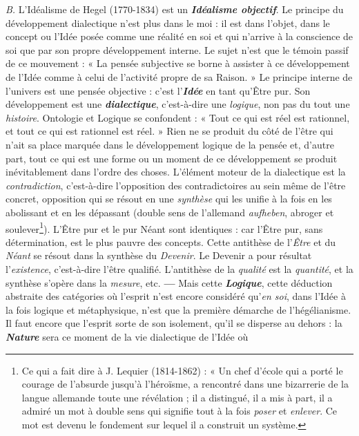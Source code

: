
{\it B.} L'Idéalisme de Hegel (1770-1834) est un \textbf{\textit {Idéalisme objectif}}.
Le principe du développement dialectique n’est plus dans le moi :
il est dans l’objet, dans le concept ou l’Idée posée comme une réalité
en soi et qui n’arrive à la conscience de soi que par son propre développement
interne. Le sujet n’est que le témoin passif de ce mouvement :
« La pensée subjective se borne à assister à ce développement
de l’Idée comme à celui de l’activité propre de sa Raison. » Le principe
interne de l’univers est une pensée objective : c’est l’\textbf{\textit {Idée}} en tant
qu’Être pur. Son développement est une \textbf{\textit {dialectique}}, c’est-à-dire
une {\it logique}, non pas du tout une {\it histoire}. Ontologie et Logique se
confondent : « Tout ce qui est réel est rationnel, et tout ce qui est
rationnel est réel. » Rien ne se produit du côté de l’être qui n’ait sa place
marquée dans le développement logique de la pensée et, d’autre part,
tout ce qui est une forme ou un moment de ce développement se
produit inévitablement dans l’ordre des choses. L'élément moteur
de la dialectique est la {\it contradiction}, c’est-à-dire l'opposition des
contradictoires au sein même de l’être concret, opposition qui se
résout en une {\it synthèse} qui les unifie à la fois en les abolissant et en
les dépassant (double sens de l'allemand {\it aufheben}, abroger et soulever\footnote{Ce qui a fait dire à J. Lequier (1814-1862) : « Un chef d'école qui a porté le courage
de l'absurde jusqu'à l’héroïsme, a rencontré dans une bizarrerie de la langue allemande
toute une révélation ; il a distingué, il a mis à part, il a admiré un mot à double sens
qui signifie tout à la fois {\it poser} et {\it enlever}. Ce mot est devenu le fondement sur lequel il a
construit un système.}).
L’Être pur et le pur Néant sont identiques : car l'Être pur,
sans détermination, est le plus pauvre des concepts. Cette antithèse
de l’{\it Être} et du {\it Néant} se résout dans la synthèse du {\it Devenir}. Le Devenir
a pour résultat l'{\it existence}, c’est-à-dire l'être qualifié. L’antithèse de
la {\it qualité} est la {\it quantité}, et la synthèse s’opère dans la {\it mesure}, etc. {\bf —}
Mais cette \textbf{\textit {Logique}}, cette déduction abstraite des catégories où
l'esprit n’est encore considéré qu’{\it en soi}, dans l’Idée à la fois logique
et métaphysique, n’est que la première démarche de l’hégélianisme.
Il faut encore que l’esprit sorte de son isolement, qu’il se disperse au
dehors : la \textbf{\textit {Nature}} sera ce moment de la vie dialectique de l’Idée où
